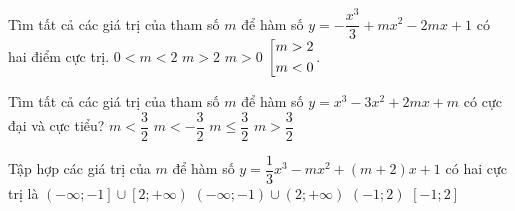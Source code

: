 \begin{ex}%
	Tìm tất cả các giá trị của tham số $ m$ để hàm số $y=-\dfrac{x^3}{3}+m{x^2}-2mx+1$ có hai điểm cực trị.
	\choice
	{$0<m<2$}
	{$m>2$}
	{$m>0$}
	{\True $\left[\begin{aligned}&m>2\\&m<0\\\end{aligned}\right.$.}
\end{ex} 
\begin{ex}%
	Tìm tất cả các giá trị của tham số $m$ để hàm số $y=x^3-3x^2+2m x+m$ có cực đại và cực tiểu?
	\choice
	{\True $m<\dfrac{3}{2}$}
	{$m<-\dfrac{3}{2}$}
	{$m\leq \dfrac{3}{2}$}
	{$m>\dfrac{3}{2}$}
\end{ex}
\begin{ex}%
	Tập hợp các giá trị của $ m$ để hàm số $ y=\dfrac{1}{3}{x^3}-m{x^2}+\left(m+2\right)x+1$ có hai cực trị là
	\choice
	{$\left(-\infty;-1\right]\cup\left[2;+\infty\right)$}
	{\True $\left(-\infty;-1\right)\cup\left(2;+\infty\right)$}
	{$\left(-1;2\right)$}
	{$\left[-1;2\right]$}
\end{ex}
